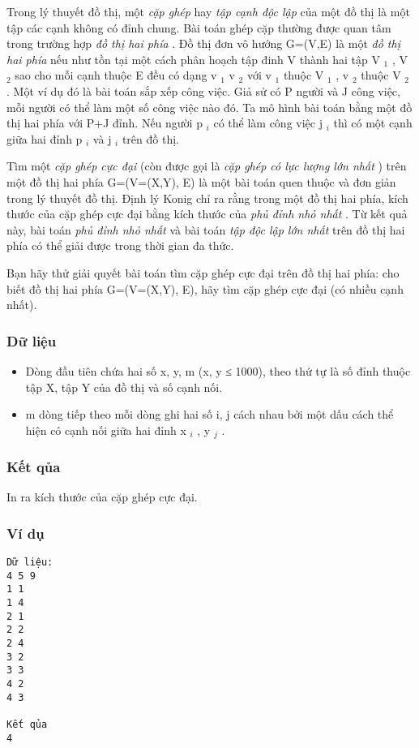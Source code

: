 



   Trong lý thuyết đồ thị, một   \textit{    cặp ghép   }   hay   \textit{    tập cạnh độc lập   }   của một đồ thị là một tập các cạnh không có đỉnh chung. Bài toán ghép   cặp thường được quan tâm trong trường hợp   \textit{    đồ thị hai phía   }   . Đồ thị đơn vô hướng G=(V,E) là một   \textit{    đồ thị hai phía   }   nếu như tồn tại một   cách phân hoạch tập đinh V thành hai tập V   $_    1   $   , V   $_    2   $   sao cho mỗi cạnh thuộc E đều có dạng v   $_    1   $   v   $_    2   $   với v   $_    1   $   thuộc V   $_    1   $   , v   $_    2   $   thuộc V   $_    2   $   . Một ví dụ đó là bài toán sắp xếp công việc. Giả sử có P người và   J công việc, mỗi người có thể làm một số công việc nào đó. Ta mô hình bài toán bằng một đồ thị hai phía với P+J đỉnh. Nếu người p   $_    i   $   có   thể làm công việc j   $_    i   $   thì có một cạnh giữa hai đỉnh p   $_    i   $   và j   $_    i   $   trên đồ thị.  

   Tìm một   \textit{    cặp ghép cực đại   }   (còn được gọi là   \textit{    cặp ghép có lực lượng lớn nhất   }   ) trên một đồ thị hai phía G=(V=(X,Y), E) là một bài   toán quen thuộc và đơn giản trong lý thuyết đồ thị. Định lý Konig chỉ ra rằng trong một đồ thị hai phía, kích thước của cặp ghép cực đại bằng kích thước   của   \textit{    phủ đỉnh nhỏ nhất   }   . Từ kết quả này, bài toán   \textit{    phủ đỉnh nhỏ nhất   }   và bài toán   \textit{    tập độc lập lớn nhất   }   trên đồ thị hai phía có thể giải   được trong thời gian đa thức.  

   Bạn hãy thử giải quyết bài toán tìm cặp ghép cực đại trên đồ thị hai phía: cho biết đồ thị hai phía G=(V=(X,Y), E), hãy tìm cặp ghép cực đại (có   nhiều cạnh nhất).  

\subsubsection{   Dữ liệu  }
\begin{itemize}
	\item     Dòng đầu tiên chứa hai số x, y, m  (x, y ≤ 1000), theo thứ tự là số đỉnh thuộc tập X, tập Y của đồ thị và số cạnh nối.   
	\item     m dòng tiếp theo mỗi dòng ghi hai số i, j cách nhau bởi một dấu cách thể hiện có cạnh nối giữa hai đỉnh x    $_     i    $    , y    $_     j    $    .   
\end{itemize}

\subsubsection{   Kết qủa  }

   In ra kích thước của cặp ghép cực đại.  

\subsubsection{   Ví dụ  }
\begin{verbatim}
Dữ liệu:
4 5 9
1 1
1 4
2 1
2 2
2 4
3 2
3 3
4 2
4 3

Kết qủa
4
\end{verbatim}